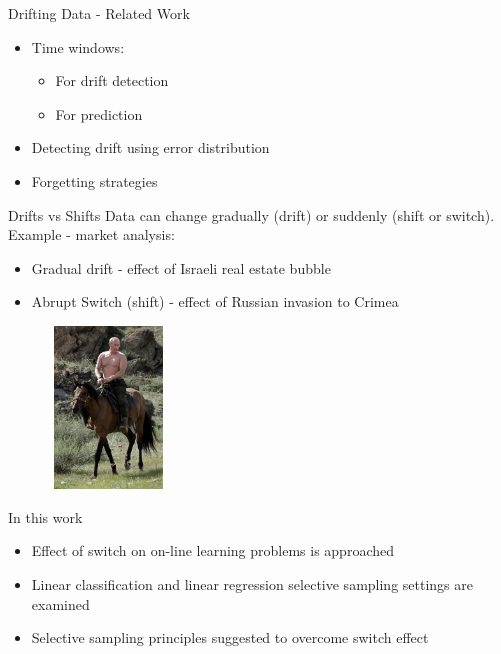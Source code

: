 \documentclass{beamer}
\begin{document}
\begin{frame}{Drifting Data - Related Work}


\begin{itemize}
\item Time windows:\newline
\begin{itemize}
\item For drift detection\newline
\item For prediction\newline
\end{itemize}
\item Detecting drift using error distribution\newline
\item Forgetting strategies
\end{itemize}
\end{frame}

\begin{frame}{Drifts vs Shifts}
Data can change gradually (drift) or suddenly (shift or switch). \newline\newline
Example - market analysis:\newline
\begin{itemize}
\item Gradual drift -  effect of Israeli real estate bubble
\item  Abrupt Switch (shift)  - effect of Russian invasion to Crimea 
\end{itemize}
\begin{center}
\includegraphics[height=1.7in,width=2.1in]{putin.jpg}
\end{center}
\end{frame}

\begin{frame}{In this work}
\begin{itemize}
\item Effect of switch on on-line learning problems is approached\newline
\item Linear classification and linear regression selective sampling settings are examined\newline
\item Selective sampling principles suggested to overcome switch effect\newline
\end{itemize}
\end{frame}
\end{document}
